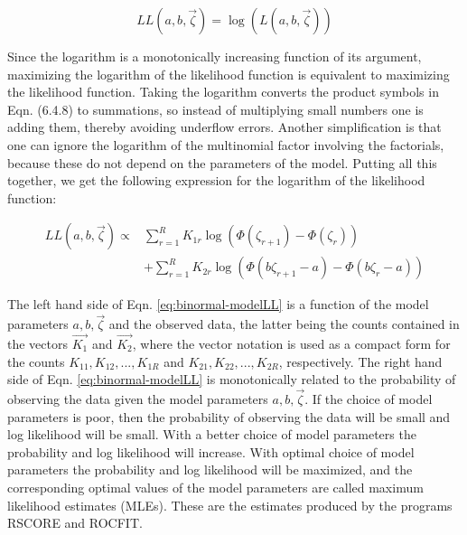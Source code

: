 \documentclass[
]{book}
\begin{document}
\begin{equation} 
LL\left ( a,b,\overrightarrow{\zeta} \right )=\log \left ( L\left ( a,b,\overrightarrow{\zeta} \right ) \right )
\label{eq:binormal-modelLogLikelihood}
\end{equation}

Since the logarithm is a monotonically increasing function of its argument, maximizing the logarithm of the likelihood function is equivalent to maximizing the likelihood function. Taking the logarithm converts the product symbols in Eqn. (6.4.8) to summations, so instead of multiplying small numbers one is adding them, thereby avoiding underflow errors. Another simplification is that one can ignore the logarithm of the multinomial factor involving the factorials, because these do not depend on the parameters of the model. Putting all this together, we get the following expression for the logarithm of the likelihood function:

\begin{equation} 
\begin{split}
LL\left ( a,b,\overrightarrow{\zeta} \right ) \propto& \sum_{r=1}^{R} K_{1r}\log \left ( \Phi\left ( \zeta_{r+1} \right ) - \Phi\left ( \zeta_r \right ) \right ) \\
&+ \sum_{r=1}^{R} K_{2r}\log \left ( \Phi\left (b \zeta_{r+1} - a \right ) - \Phi\left ( b \zeta_r - a \right ) \right ) 
\end{split}
\label{eq:binormal-modelLL}
\end{equation}

The left hand side of Eqn. \eqref{eq:binormal-modelLL} is a function of the model parameters \(a,b,\overrightarrow{\zeta}\) and the observed data, the latter being the counts contained in the vectors \(\overrightarrow{K_1}\) and \(\overrightarrow{K_2}\), where the vector notation is used as a compact form for the counts \(K_{11},K_{12},...,K_{1R}\) and \(K_{21},K_{22},...,K_{2R}\), respectively. The right hand side of Eqn. \eqref{eq:binormal-modelLL} is monotonically related to the probability of observing the data given the model parameters \(a,b,\overrightarrow{\zeta}\). If the choice of model parameters is poor, then the probability of observing the data will be small and log likelihood will be small. With a better choice of model parameters the probability and log likelihood will increase. With optimal choice of model parameters the probability and log likelihood will be maximized, and the corresponding optimal values of the model parameters are called maximum likelihood estimates (MLEs). These are the estimates produced by the programs RSCORE and ROCFIT.
\end{document}
